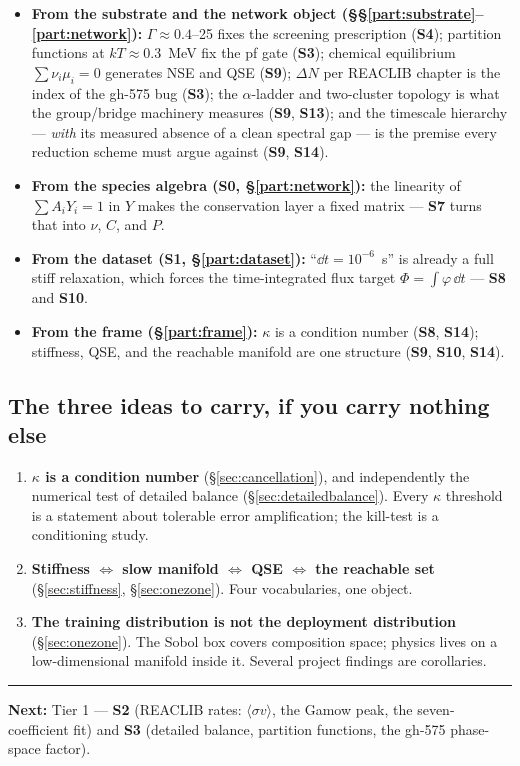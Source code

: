 \begin{itemize}
\item \textbf{From the substrate and the network object
      (\S\S\ref{part:substrate}--\ref{part:network}):}
      $\Gamma \approx 0.4$--25 fixes the screening prescription (\textbf{S4});
      partition functions at $kT \approx 0.3$~MeV fix the pf gate
      (\textbf{S3}); chemical equilibrium $\sum\nu_i\mu_i = 0$ generates NSE and
      QSE (\textbf{S9}); $\Delta N$ per REACLIB chapter is the index of the
      gh-575 bug (\textbf{S3}); the $\alpha$-ladder and two-cluster topology is
      what the group/bridge machinery measures (\textbf{S9}, \textbf{S13}); and
      the timescale hierarchy --- \emph{with} its measured absence of a clean
      spectral gap --- is the premise every reduction scheme must argue against
      (\textbf{S9}, \textbf{S14}).

\item \textbf{From the species algebra (\textbf{S0},
      \S\ref{part:network}):} the linearity of $\sum A_i Y_i = 1$ in $Y$
      makes the conservation layer a fixed matrix --- \textbf{S7} turns that
      into $\nu$, $C$, and $P$.

\item \textbf{From the dataset (\textbf{S1}, \S\ref{part:dataset}):}
      ``$\dd t = 10^{-6}$~s'' is already a full stiff relaxation, which forces
      the time-integrated flux target $\Phi = \int\varphi\,\dd t$ ---
      \textbf{S8} and \textbf{S10}.

\item \textbf{From the frame (\S\ref{part:frame}):} $\kappa$ is a condition
      number (\textbf{S8}, \textbf{S14}); stiffness, QSE, and the reachable
      manifold are one structure (\textbf{S9}, \textbf{S10}, \textbf{S14}).
\end{itemize}

\subsection*{The three ideas to carry, if you carry nothing else}

\begin{enumerate}
\item \textbf{$\kappa$ is a condition number} (\S\ref{sec:cancellation}), and
      independently the numerical test of detailed balance
      (\S\ref{sec:detailedbalance}). Every $\kappa$ threshold is a statement
      about tolerable error amplification; the kill-test is a conditioning
      study.
\item \textbf{Stiffness $\iff$ slow manifold $\iff$ QSE $\iff$ the reachable
      set} (\S\ref{sec:stiffness}, \S\ref{sec:onezone}). Four vocabularies, one
      object.
\item \textbf{The training distribution is not the deployment distribution}
      (\S\ref{sec:onezone}). The Sobol box covers composition space; physics
      lives on a low-dimensional manifold inside it. Several project findings
      are corollaries.
\end{enumerate}

\vspace{1em}
\hrule
\vspace{1em}

\noindent
\textbf{Next:} Tier 1 --- \textbf{S2} (REACLIB rates:
$\langle\sigma v\rangle$, the Gamow peak, the seven-coefficient fit) and
\textbf{S3} (detailed balance, partition functions, the gh-575 phase-space
factor).
